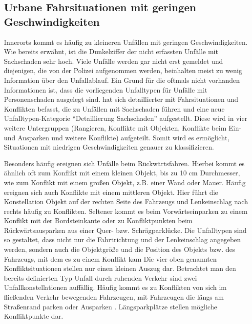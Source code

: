 \subsection{Urbane Fahrsituationen mit geringen Geschwindigkeiten}\label{Urabane Fahrsituationen mit geringen Geschwindigkeiten}
Innerorts kommt es häufig zu kleineren Unfällen mit geringen Geschwindigkeiten. Wie bereits erwähnt, ist die Dunkelziffer der nicht erfassten Unfälle mit Sachschaden sehr hoch. Viele Unfälle werden gar nicht erst gemeldet und diejenigen, die von der Polizei aufgenommen werden, beinhalten meist zu wenig Information über den Unfallablauf. Ein Grund für die oftmals nicht vorhanden Informationen ist, dass die vorliegenden Unfalltypen für Unfälle mit Personenschaden ausgelegt sind. \Textcite[S. 58]{Gschwendtner.2015} hat sich detaillierter mit Fahrsituationen und Konflikten befasst, die zu Unfällen mit Sachschaden führen und eine neue Unfalltypen-Kategorie \enquote{Detaillierung Sachschaden} aufgestellt. Diese wird in vier weitere Untergruppen (Rangieren, Konflikte mit Objekten, Konflikte beim Ein- und Ausparken und weitere Konflikte) aufgeteilt. Somit wird es ermöglicht, Situationen mit niedrigen Geschwindigkeiten genauer zu klassifizieren.

Besonders häufig ereignen sich Unfälle beim Rückwärtsfahren. Hierbei kommt es ähnlich oft zum Konflikt mit einem kleinen Objekt, bis zu 10 cm Durchmesser, wie zum Konflikt mit einem großen Objekt, z.B. einer Wand oder Mauer. Häufig ereignen sich auch Konflikte mit einem mittleren Objekt. Hier führt die Konstellation Objekt auf der rechten Seite des Fahrzeugs und Lenkeinschlag nach rechts häufig zu Konflikten. Seltener kommt es beim Vorwärtseinparken zu einem Konflikt mit der Bordsteinkante oder zu Konfliktpunkten beim Rückwärtsausparken aus einer Quer- bzw. Schrägparklücke. Die Unfalltypen sind so gestaltet, dass nicht nur die Fahrtrichtung und der Lenkeinschlag angegeben werden, sondern auch die Objektgröße und die Position des Objekts bzw. des Fahrzeugs, mit dem es zu einem Konflikt kam \parencite[S. 58-61]{Gschwendtner.2015} Die vier oben genannten Konfliktsituationen stellen nur einen kleinen Auszug dar. Betrachtet man den bereits definierten Typ Unfall durch ruhenden Verkehr sind zwei Unfallkonstellationen auffällig. Häufig kommt es zu Konflikten von sich im fließenden Verkehr bewegenden Fahrzeugen, mit  Fahrzeugen die längs am Straßenrand parken oder Ausparken \parencite[S. 53]{Vollrath.2006}. Längsparkplätze stellen mögliche Konfliktpunkte dar. %

